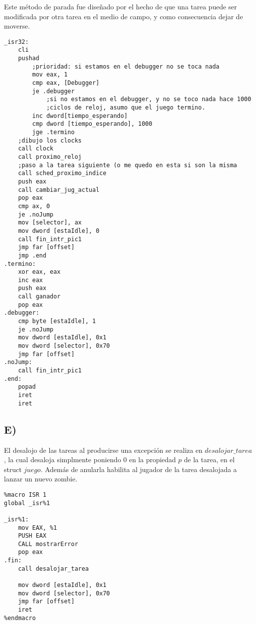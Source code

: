Este m\'etodo de parada fue diseñado por el hecho de que una tarea puede ser modificada por otra tarea en el medio de campo, y como consecuencia 
dejar de moverse.

		
\begin{codesnippet}
\begin{verbatim}
_isr32:
	cli
	pushad
		;prioridad: si estamos en el debugger no se toca nada
		mov eax, 1
		cmp eax, [Debugger]
		je .debugger
			;si no estamos en el debugger, y no se toco nada hace 1000 
			;ciclos de reloj, asumo que el juego termino.
		inc dword[tiempo_esperando]
		cmp dword [tiempo_esperando], 1000
		jge .termino
	;dibujo los clocks
	call clock
	call proximo_reloj
	;paso a la tarea siguiente (o me quedo en esta si son la misma
	call sched_proximo_indice
	push eax
	call cambiar_jug_actual
	pop eax
	cmp ax, 0
	je .noJump
	mov [selector], ax
	mov dword [estaIdle], 0
	call fin_intr_pic1
	jmp far [offset]
	jmp .end
.termino:
	xor eax, eax
	inc eax
	push eax
	call ganador
	pop eax
.debugger:
	cmp byte [estaIdle], 1
	je .noJump
	mov dword [estaIdle], 0x1
	mov dword [selector], 0x70
	jmp far [offset]
.noJump:
	call fin_intr_pic1
.end:
	popad
	iret
	iret
\end{verbatim}
\end{codesnippet}

\subsection*{E)}
El desalojo de las tareas al producirse una excepci\'on se realiza en $desalojar\_tarea$, la cual desaloja simplmente poniendo 0 en la propiedad 
$p$ de la tarea, en el struct $juego$. Adem\'as de anularla habilita al jugador de la tarea desalojada a lanzar un nuevo zombie.

\begin{codesnippet}
\begin{verbatim}
%macro ISR 1
global _isr%1

_isr%1:
    mov EAX, %1
    PUSH EAX
    CALL mostrarError
    pop eax
.fin:
    call desalojar_tarea
    
    mov dword [estaIdle], 0x1
    mov dword [selector], 0x70
	jmp far [offset]
    iret
%endmacro
\end{verbatim}
\end{codesnippet}

